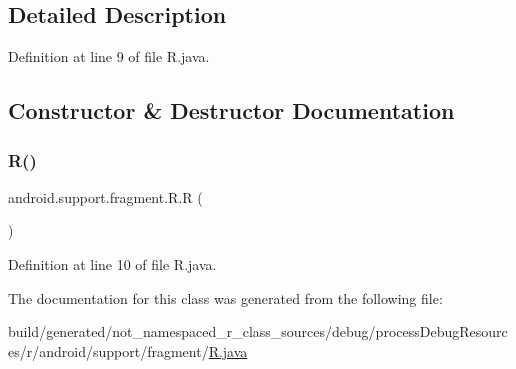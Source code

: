 \subsection{Detailed Description}


Definition at line 9 of file R.\+java.



\subsection{Constructor \& Destructor Documentation}
\mbox{\label{classandroid_1_1support_1_1fragment_1_1_r_ac2098583343558d9dd2ab4c9147159d9}} 
\subsubsection{\texorpdfstring{R()}{R()}}
{\footnotesize\ttfamily android.\+support.\+fragment.\+R.\+R (\begin{DoxyParamCaption}{ }\end{DoxyParamCaption})\hspace{0.3cm}{\ttfamily [private]}}



Definition at line 10 of file R.\+java.


\begin{DoxyCode}{0}

\end{DoxyCode}


The documentation for this class was generated from the following file\+:\begin{DoxyCompactItemize}
\item 
build/generated/not\+\_\+namespaced\+\_\+r\+\_\+class\+\_\+sources/debug/process\+Debug\+Resources/r/android/support/fragment/\mbox{\hyperlink{android_2support_2fragment_2_r_8java}{R.\+java}}\end{DoxyCompactItemize}
